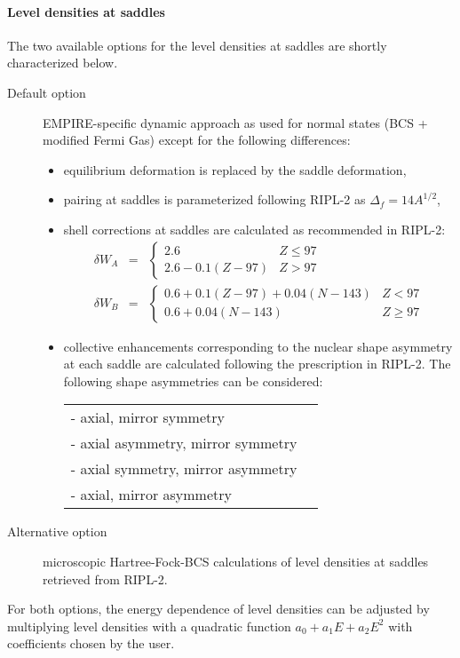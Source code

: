 \documentclass[twocolumn,amsmath,amssymb,10pt,groupedaddress,letter]{revtex4}
\begin{document}
\paragraph{Level densities at saddles\label{ldsaddle}}
The two available options for the level densities at saddles are shortly characterized below.
\begin{description}
\item [Default option] EMPIRE-specific dynamic approach as used for normal
states (BCS + modified Fermi Gas) except for the following differences:
\begin{itemize}
\item equilibrium deformation is replaced by the saddle deformation,
\item pairing at saddles is parameterized following RIPL-2 as $\Delta_{f}=14A^{1/2}$,
\item shell corrections at saddles are calculated as recommended in RIPL-2:
\begin{eqnarray}
\delta W_{A}&=&\left\{ \begin{array}{lr}
2.6 & Z\leq97\\
2.6-0.1(Z-97) & Z>97\end{array}\right.\nonumber\\
\delta W_{B}&=&\left\{ \begin{array}{lr}
0.6+0.1(Z-97)+0.04(N-143) & Z<97\\
0.6+0.04(N-143) & Z\geq97\end{array}\right.\nonumber
\end{eqnarray}
\item collective enhancements corresponding to the nuclear shape asymmetry
at each saddle are calculated following the prescription in RIPL-2.
The following shape asymmetries can be considered:
\begin{tabular}{ll}
 - axial, mirror symmetry\tabularnewline
 - axial asymmetry, mirror symmetry\tabularnewline
 - axial symmetry, mirror asymmetry\tabularnewline
 - axial, mirror asymmetry \tabularnewline
\end{tabular}
\end{itemize}

\item [Alternative option] microscopic Hartree-Fock-BCS calculations of level densities
at saddles retrieved from RIPL-2.
\end{description}
For both options, the energy dependence of level densities
can be adjusted by multiplying level densities with a quadratic function
$a_{0}+a_{1}E+a_{2}E^{2}$ with coefficients chosen by the user.
\end{document}
